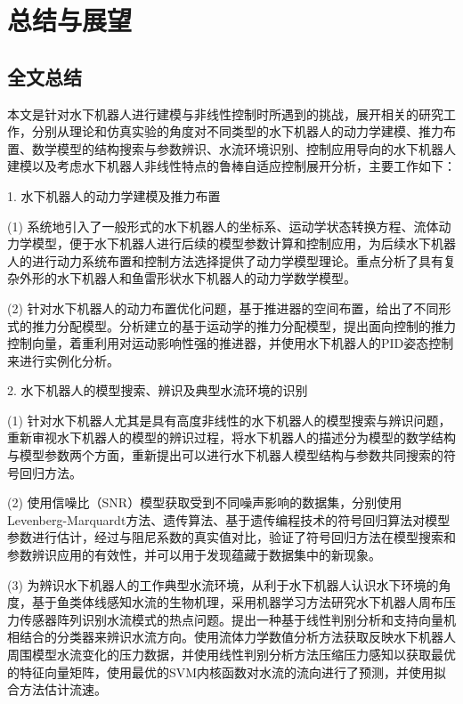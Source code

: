
\chapter{总结与展望}

\label{chap:conclusion}
\section{全文总结}

本文是针对水下机器人进行建模与非线性控制时所遇到的挑战，展开相关的研究工作，分别从理论和仿真实验的角度对不同类型的水下机器人的动力学建模、推力布置、数学模型的结构搜索与参数辨识、水流环境识别、控制应用导向的水下机器人建模以及考虑水下机器人非线性特点的鲁棒自适应控制展开分析，主要工作如下：

1. 水下机器人的动力学建模及推力布置

(1) 系统地引入了一般形式的水下机器人的坐标系、运动学状态转换方程、流体动
力学模型，便于水下机器人进行后续的模型参数计算和控制应用，为后续水下机器人的进行动力系统布置和控制方法选择提供了动力学模型理论。重点分析了具有复杂外形的水下机器人和鱼雷形状水下机器人的动力学数学模型。

(2) 针对水下机器人的动力布置优化问题，基于推进器的空间布置，给出了不同形式的推力分配模型。分析建立的基于运动学的推力分配模型，提出面向控制的推力控制向量，着重利用对运动影响性强的推进器，并使用水下机器人的PID姿态控制来进行实例化分析。

2. 水下机器人的模型搜索、辨识及典型水流环境的识别

(1) 针对水下机器人尤其是具有高度非线性的水下机器人的模型搜索与辨识问题，重新审视水下机器人的模型的辨识过程，将水下机器人的描述分为模型的数学结构与模型参数两个方面，重新提出可以进行水下机器人模型结构与参数共同搜索的符号回归方法。

(2) 使用信噪比（SNR）模型获取受到不同噪声影响的数据集，分别使用Levenberg-Marquardt方法、遗传算法、基于遗传编程技术的符号回归算法对模型参数进行估计，经过与阻尼系数的真实值对比，验证了符号回归方法在模型搜索和参数辨识应用的有效性，并可以用于发现蕴藏于数据集中的新现象。

(3) 为辨识水下机器人的工作典型水流环境，从利于水下机器人认识水下环境的角度，基于鱼类体线感知水流的生物机理，采用机器学习方法研究水下机器人周布压力传感器阵列识别水流模式的热点问题。提出一种基于线性判别分析和支持向量机相结合的分类器来辨识水流方向。使用流体力学数值分析方法获取反映水下机器人周围模型水流变化的压力数据，并使用线性判别分析方法压缩压力感知以获取最优的特征向量矩阵，使用最优的SVM内核函数对水流的流向进行了预测，并使用拟合方法估计流速。

